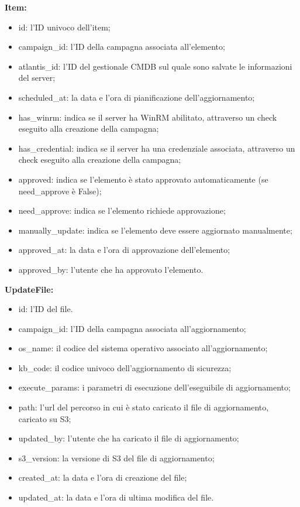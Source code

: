 \textbf{Item:}
\begin{itemize}
\item id: l'ID univoco dell’item;
\item campaign\_id: l’ID della campagna associata all'elemento;
\item atlantis\_id: l'ID del gestionale CMDB sul quale sono salvate le informazioni del server;
\item scheduled\_at: la data e l'ora di pianificazione dell'aggiornamento;
\item has\_winrm: indica se il server ha WinRM abilitato, attraverso un check eseguito alla creazione della campagna;
\item has\_credential: indica se il server ha una credenziale associata, attraverso un check eseguito alla creazione della campagna;
\item approved: indica se l'elemento è stato approvato automaticamente (se need\_approve è False);
\item need\_approve: indica se l'elemento richiede approvazione;
\item manually\_update: indica se l'elemento deve essere aggiornato manualmente;
\item approved\_at: la data e l'ora di approvazione dell'elemento;
\item approved\_by: l'utente che ha approvato l'elemento.
\end{itemize}

\textbf{UpdateFile:}
\begin{itemize}
\item id: l'ID del file.
\item campaign\_id: l'ID della campagna associata all'aggiornamento;
\item os\_name: il codice del sistema operativo associato all'aggiornamento;
\item kb\_code: il codice univoco dell'aggiornamento di sicurezza;
\item execute\_params: i parametri di esecuzione dell'eseguibile di aggiornamento;
\item path: l'url del percorso in cui è stato caricato il file di aggiornamento, caricato su S3;
\item updated\_by: l'utente che ha caricato il file di aggiornamento;
\item s3\_version: la versione di S3 del file di aggiornamento;
\item created\_at: la data e l'ora di creazione del file;
\item updated\_at: la data e l'ora di ultima modifica del file.
\end{itemize}

